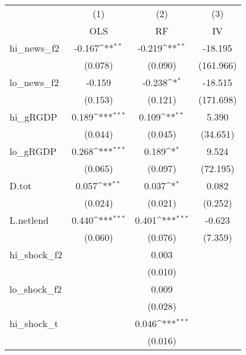 {
\def\sym#1{\ifmmode^{#1}\else\(^{#1}\)\fi}
\begin{tabular}{l*{3}{c}}
\toprule
            &\multicolumn{1}{c}{(1)}&\multicolumn{1}{c}{(2)}&\multicolumn{1}{c}{(3)}\\
            &\multicolumn{1}{c}{OLS}&\multicolumn{1}{c}{RF}&\multicolumn{1}{c}{IV}\\
\midrule
hi\_news\_f2  &      -0.167\sym{**} &      -0.219\sym{**} &     -18.195         \\
            &     (0.078)         &     (0.090)         &   (161.966)         \\
\addlinespace
lo\_news\_f2  &      -0.159         &      -0.238\sym{*}  &     -18.515         \\
            &     (0.153)         &     (0.121)         &   (171.698)         \\
\addlinespace
hi\_gRGDP    &       0.189\sym{***}&       0.109\sym{**} &       5.390         \\
            &     (0.044)         &     (0.045)         &    (34.651)         \\
\addlinespace
lo\_gRGDP    &       0.268\sym{***}&       0.189\sym{*}  &       9.524         \\
            &     (0.065)         &     (0.097)         &    (72.195)         \\
\addlinespace
D.tot       &       0.057\sym{**} &       0.037\sym{*}  &       0.082         \\
            &     (0.024)         &     (0.021)         &     (0.252)         \\
\addlinespace
L.netlend   &       0.440\sym{***}&       0.401\sym{***}&      -0.623         \\
            &     (0.060)         &     (0.076)         &     (7.359)         \\
\addlinespace
hi\_shock\_f2 &                     &       0.003         &                     \\
            &                     &     (0.010)         &                     \\
\addlinespace
lo\_shock\_f2 &                     &       0.009         &                     \\
            &                     &     (0.028)         &                     \\
\addlinespace
hi\_shock\_t  &                     &       0.046\sym{***}&                     \\
            &                     &     (0.016)         &                     \\

\end{tabular}}
